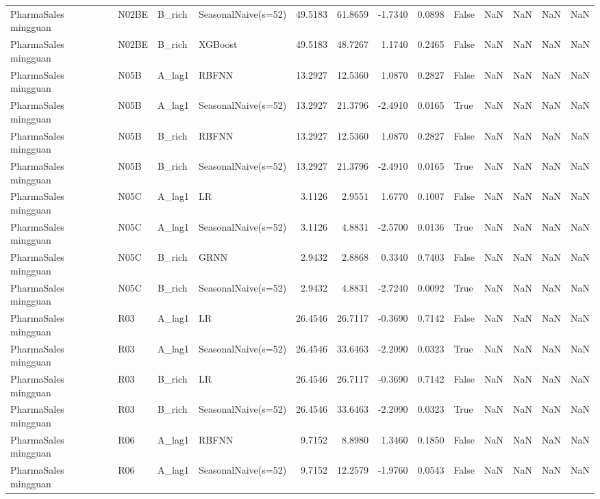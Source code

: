 \begin{table}
\begin{tabular}{llllrrrrllrrl}
PharmaSales mingguan & N02BE & B\_rich & SeasonalNaive(s=52) & 49.5183 & 61.8659 & -1.7340 & 0.0898 & False & NaN & NaN & NaN & NaN \\
PharmaSales mingguan & N02BE & B\_rich & XGBoost & 49.5183 & 48.7267 & 1.1740 & 0.2465 & False & NaN & NaN & NaN & NaN \\
PharmaSales mingguan & N05B & A\_lag1 & RBFNN & 13.2927 & 12.5360 & 1.0870 & 0.2827 & False & NaN & NaN & NaN & NaN \\
PharmaSales mingguan & N05B & A\_lag1 & SeasonalNaive(s=52) & 13.2927 & 21.3796 & -2.4910 & 0.0165 & True & NaN & NaN & NaN & NaN \\
PharmaSales mingguan & N05B & B\_rich & RBFNN & 13.2927 & 12.5360 & 1.0870 & 0.2827 & False & NaN & NaN & NaN & NaN \\
PharmaSales mingguan & N05B & B\_rich & SeasonalNaive(s=52) & 13.2927 & 21.3796 & -2.4910 & 0.0165 & True & NaN & NaN & NaN & NaN \\
PharmaSales mingguan & N05C & A\_lag1 & LR & 3.1126 & 2.9551 & 1.6770 & 0.1007 & False & NaN & NaN & NaN & NaN \\
PharmaSales mingguan & N05C & A\_lag1 & SeasonalNaive(s=52) & 3.1126 & 4.8831 & -2.5700 & 0.0136 & True & NaN & NaN & NaN & NaN \\
PharmaSales mingguan & N05C & B\_rich & GRNN & 2.9432 & 2.8868 & 0.3340 & 0.7403 & False & NaN & NaN & NaN & NaN \\
PharmaSales mingguan & N05C & B\_rich & SeasonalNaive(s=52) & 2.9432 & 4.8831 & -2.7240 & 0.0092 & True & NaN & NaN & NaN & NaN \\
PharmaSales mingguan & R03 & A\_lag1 & LR & 26.4546 & 26.7117 & -0.3690 & 0.7142 & False & NaN & NaN & NaN & NaN \\
PharmaSales mingguan & R03 & A\_lag1 & SeasonalNaive(s=52) & 26.4546 & 33.6463 & -2.2090 & 0.0323 & True & NaN & NaN & NaN & NaN \\
PharmaSales mingguan & R03 & B\_rich & LR & 26.4546 & 26.7117 & -0.3690 & 0.7142 & False & NaN & NaN & NaN & NaN \\
PharmaSales mingguan & R03 & B\_rich & SeasonalNaive(s=52) & 26.4546 & 33.6463 & -2.2090 & 0.0323 & True & NaN & NaN & NaN & NaN \\
PharmaSales mingguan & R06 & A\_lag1 & RBFNN & 9.7152 & 8.8980 & 1.3460 & 0.1850 & False & NaN & NaN & NaN & NaN \\
PharmaSales mingguan & R06 & A\_lag1 & SeasonalNaive(s=52) & 9.7152 & 12.2579 & -1.9760 & 0.0543 & False & NaN & NaN & NaN & NaN \\

\end{tabular}
\end{table}
